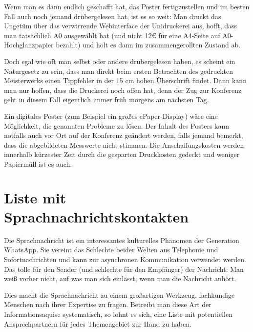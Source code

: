 \documentclass[a5paper,pagesize,10pt,bibtotoc,pointlessnumbers,normalheadings,DIV=9,twoside=false]{scrbook}
\begin{document}
Wenn man es dann endlich geschafft hat, das Poster fertigzustellen und im besten Fall auch noch jemand drübergelesen hat, ist es so weit:
Man druckt das Ungetüm über das verwirrende Webinterface der Unidruckerei aus, hofft, dass man tatsächlich A0 ausgewählt hat (und nicht 12€ für eine A4-Seite auf A0-Hochglanzpapier bezahlt) und holt es dann im zusammengerollten Zustand ab.

Doch egal wie oft man selbst oder andere drübergelesen haben, es scheint ein Naturgesetz zu sein, dass man direkt beim ersten Betrachten des gedruckten Meisterwerks einen Tippfehler in der 15 cm hohen Überschrift findet.
Dann kann man nur hoffen, dass die Druckerei noch offen hat, denn der Zug zur Konferenz geht in diesem Fall eigentlich immer früh morgens am nächsten Tag.

Ein digitales Poster (zum Beispiel ein großes ePaper-Display) wäre eine Möglichkeit, die genannten Probleme zu lösen.
Der Inhalt des Posters kann notfalls auch vor Ort auf der Konferenz geändert werden, falls jemand bemerkt, dass die abgebildeten Messwerte nicht stimmen.
Die Anschaffungskosten werden innerhalb kürzester Zeit durch die gesparten Druckkosten gedeckt und weniger Papiermüll ist es auch.



\chapter{Liste mit Sprachnachrichtskontakten}

Die Sprachnachricht ist ein interessantes kulturelles Phänomen der Generation WhatsApp.
Sie vereint das Schlechte beider Welten aus Telephonie und Sofortnachrichten und kann zur asynchronen Kommunikation verwendet werden.
Das tolle für den Sender (und schlechte für den Empfänger) der Nachricht: Man weiß vorher nicht, auf was man sich einlässt, wenn man die Nachricht anhört.

Dies macht die Sprachnachricht zu einem großartigen Werkzeug, fachkundige Menschen nach ihrer Expertise zu fragen.
Betreibt man diese Art der Informationsaquise systematisch, so lohnt es sich, eine Liste mit potentiellen Ansprechpartnern für jedes Themengebiet zur Hand zu haben.

\end{document}
